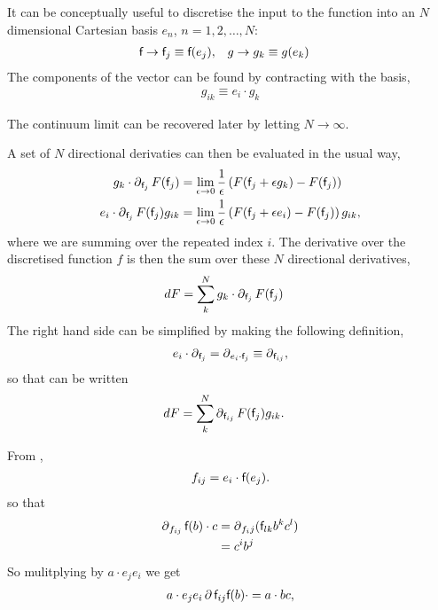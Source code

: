 It can be conceptually useful to discretise the input to the function
into an
%
$N$ dimensional Cartesian
basis $e_n$, $n = 1, 2, \ldots, N$:
\begin{align}
& {\textsf {f}} \rightarrow {\textsf {f}}_j  \equiv {\textsf {f}}(e_j), &g \rightarrow g_k  \equiv g(e_k) &
\end{align}
The components of the vector can be found by contracting with the basis,
\begin{align}
 g_{ik} \equiv  e_i \cdot g_k
\end{align}

The continuum limit can be recovered later by letting
$N\rightarrow\infty$.



A set of $N$ directional derivaties can then be evaluated in the usual
way,
\begin{align}
 g_k \cdot \operatorname{\partial}_{{\textsf {f}}_j} F( {\textsf {f}}_j ) &= \lim_{\epsilon \rightarrow 0} \frac{1}{\epsilon}
   \left( F( {\textsf {f}}_j + \epsilon g_k)  - F( {\textsf {f}}_j )  \right)
\\
e_i \cdot \operatorname{\partial}_{{\textsf {f}}_j} F( {\textsf {f}}_j ) g_{ik} &=\lim_{\epsilon \rightarrow 0} \frac{1}{\epsilon}
   \left( F( {\textsf {f}}_j + \epsilon e_i)  - F( {\textsf {f}}_j )  \right)g_{ik},
\end{align}
where we are summing over the repeated index $i$.
The derivative over the discretised function $f$ is then the sum over
these $N$ directional derivatives,
\begin{align}
 dF &=  \sum_k^N g_k \cdot \operatorname{\partial}_{{\textsf {f}}_j} F({\textsf {f}}_j) 
 \label{eqn:vectorized_functional_derivative}
\end{align}
The right hand side can be simplified by making the following
definition,
\begin{align}
e_i \cdot \operatorname{\partial}_{{\textsf {f}}_j} = \operatorname{\partial}_{e_i \cdot {\textsf {f}}_j} \equiv \operatorname{\partial}_{{\textsf {f}}_{ij}},
\end{align}
so that  can be written
\begin{align}
 dF &=  \sum_{k}^N \operatorname{\partial}_{{\textsf {f}}_{ij}} F({\textsf {f}}_j) g_{ik}.
\end{align}

From \cite{Doran2003},
\begin{align}
 f_{ij} = e_i \cdot {\textsf {f}}(e_j).
 \end{align}
so that
\begin{align}
 \operatorname{\partial}_{f_{ij}} {\textsf {f}}(b)\cdot c &= \operatorname{\partial}_{f_ij} ({\textsf {f}}_{lk} b^k c^l) \\
 &= c^i b^j
\end{align}
So mulitplying by $a\cdot e_j e_i$ we get
\begin{align}
 a\cdot e_j e_i \operatorname{\partial}{{\textsf {f}}_{ij}} {\textsf {f}}(b)\cdot = a \cdot b c,
\end{align}

